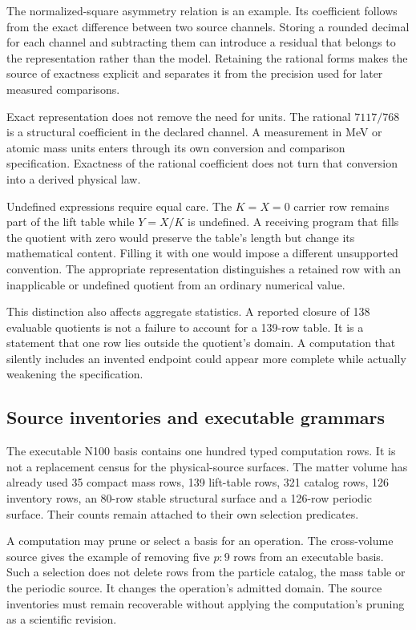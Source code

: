 The normalized-square asymmetry relation is an example. Its coefficient follows from the exact difference between two source channels. Storing a rounded decimal for each channel and subtracting them can introduce a residual that belongs to the representation rather than the model. Retaining the rational forms makes the source of exactness explicit and separates it from the precision used for later measured comparisons.

Exact representation does not remove the need for units. The rational $7117/768$ is a structural coefficient in the declared channel. A measurement in MeV or atomic mass units enters through its own conversion and comparison specification. Exactness of the rational coefficient does not turn that conversion into a derived physical law.

Undefined expressions require equal care. The $K=X=0$ carrier row remains part of the lift table while $Y=X/K$ is undefined. A receiving program that fills the quotient with zero would preserve the table's length but change its mathematical content. Filling it with one would impose a different unsupported convention. The appropriate representation distinguishes a retained row with an inapplicable or undefined quotient from an ordinary numerical value.

This distinction also affects aggregate statistics. A reported closure of 138 evaluable quotients is not a failure to account for a 139-row table. It is a statement that one row lies outside the quotient's domain. A computation that silently includes an invented endpoint could appear more complete while actually weakening the specification.

\subsection{Source inventories and executable grammars}

The executable N100 basis contains one hundred typed computation rows. It is not a replacement census for the physical-source surfaces. The matter volume has already used 35 compact mass rows, 139 lift-table rows, 321 catalog rows, 126 inventory rows, an 80-row stable structural surface and a 126-row periodic surface. Their counts remain attached to their own selection predicates.

A computation may prune or select a basis for an operation. The cross-volume source gives the example of removing five $p{:}9$ rows from an executable basis. Such a selection does not delete rows from the particle catalog, the mass table or the periodic source. It changes the operation's admitted domain. The source inventories must remain recoverable without applying the computation's pruning as a scientific revision.

